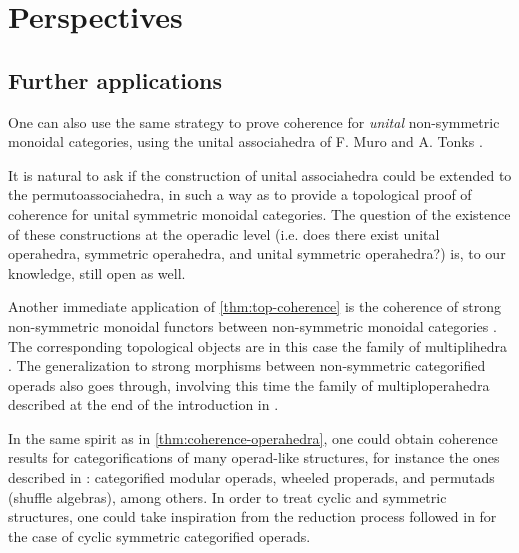 
\section{Perspectives}


\subsection{Further applications} 
\label{sec:further}
One can also use the same strategy to prove coherence for \emph{unital} non-symmetric monoidal categories, using the unital associahedra of F. Muro and A. Tonks \cite{muroUnitalAssociahedra2014}.

It is natural to ask if the construction of unital associahedra could be extended to the permutoassociahedra, in such a way as to provide a topological proof of coherence for unital symmetric monoidal categories. 
The question of the existence of these constructions at the operadic level (i.e. does there exist unital operahedra, symmetric operahedra, and unital symmetric operahedra?) is, to our knowledge, still open as well. 

Another immediate application of \cref{thm:top-coherence} is the coherence of strong non-symmetric monoidal functors between non-symmetric monoidal categories \cite{epsteinFunctorsTensoredCategories1966}. 
The corresponding topological objects are in this case the family of multiplihedra \cite{Stasheff70,Forcey08}.
The generalization to strong morphisms between non-symmetric categorified operads also goes through, involving this time the family of multiploperahedra described at the end of the introduction in \cite{MazuirLA22}.

In the same spirit as in \cref{thm:coherence-operahedra}, one could obtain coherence results for categorifications of many operad-like structures, for instance the ones described in \cite{BMO20}: categorified modular operads, wheeled properads, and permutads (shuffle algebras), among others.
In order to treat cyclic and symmetric structures, one could take inspiration from the reduction process followed in \cite{curienCategorifiedCyclicOperads2020} for the case of cyclic symmetric categorified operads.

